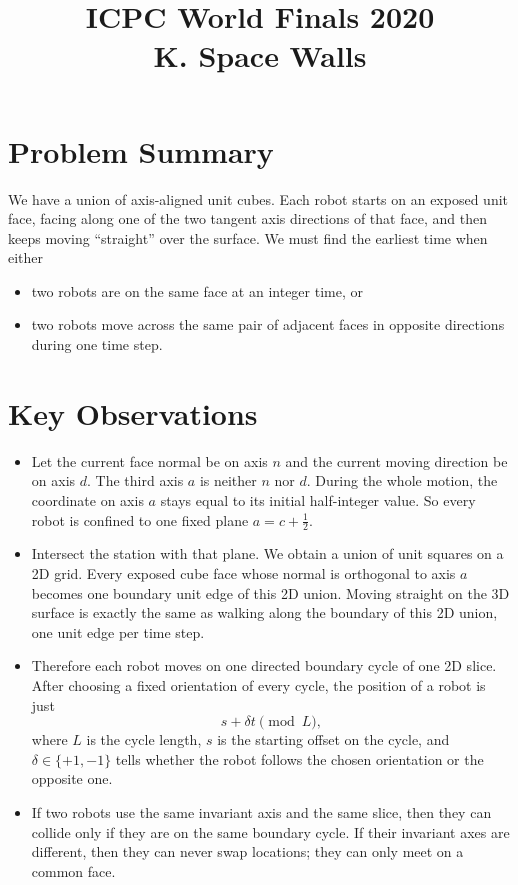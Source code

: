 \documentclass[11pt]{article}
\title{ICPC World Finals 2020\\K. Space Walls}
\author{}
\date{}
\begin{document}
\maketitle

\section*{Problem Summary}

We have a union of axis-aligned unit cubes. Each robot starts on an exposed unit face, facing along one of the
two tangent axis directions of that face, and then keeps moving ``straight'' over the surface. We must find the
earliest time when either
\begin{itemize}[leftmargin=*]
    \item two robots are on the same face at an integer time, or
    \item two robots move across the same pair of adjacent faces in opposite directions during one time step.
\end{itemize}

\section*{Key Observations}

\begin{itemize}[leftmargin=*]
    \item Let the current face normal be on axis $n$ and the current moving direction be on axis $d$.
    The third axis $a$ is neither $n$ nor $d$.
    During the whole motion, the coordinate on axis $a$ stays equal to its initial half-integer value.
    So every robot is confined to one fixed plane $a = c + \tfrac12$.
    \item Intersect the station with that plane. We obtain a union of unit squares on a 2D grid.
    Every exposed cube face whose normal is orthogonal to axis $a$ becomes one boundary unit edge of this 2D union.
    Moving straight on the 3D surface is exactly the same as walking along the boundary of this 2D union, one unit
    edge per time step.
    \item Therefore each robot moves on one directed boundary cycle of one 2D slice.
    After choosing a fixed orientation of every cycle, the position of a robot is just
    \[
        s + \delta t \pmod L,
    \]
    where $L$ is the cycle length, $s$ is the starting offset on the cycle, and $\delta \in \{+1,-1\}$ tells whether
    the robot follows the chosen orientation or the opposite one.
    \item If two robots use the same invariant axis and the same slice, then they can collide only if they are on the
    same boundary cycle.
    If their invariant axes are different, then they can never swap locations; they can only meet on a common face.
\end{itemize}
\end{document}
